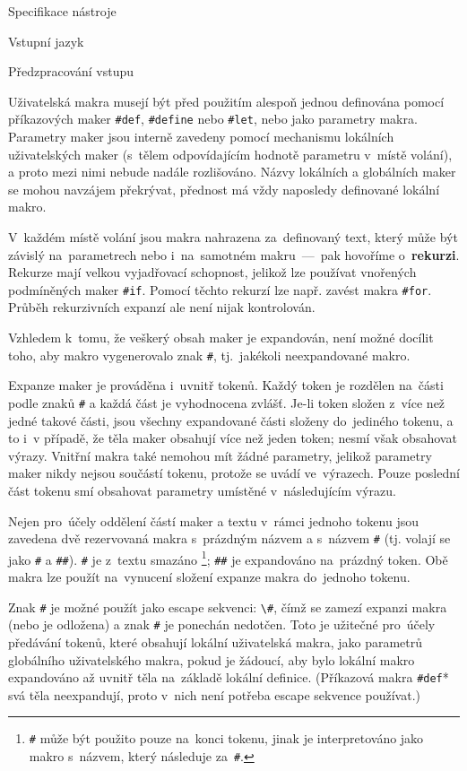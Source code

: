 \documentclass[thesis=M,czech]{FITthesis}[2012/06/26]
\newcommand{\id}[1]{\texttt{#1}}
\newcommand{\hll}[1]{\textbf{#1}}
\begin{document}
\begin{section}{Specifikace nástroje}
\begin{subsection}{Vstupní jazyk}
\begin{subsubsection}{Předzpracování vstupu}

\begin{paragraph}{Uživatelská makra}
\label{p:design:spec:ilang:macros:user}
musejí být před použitím alespoň jednou definována
pomocí příkazových maker \id{\#def}, \id{\#define} nebo \id{\#let},
nebo jako parametry makra.
Parametry maker jsou interně zavedeny pomocí mechanismu
lokálních uživatelských maker
(s~tělem odpovídajícím hodnotě parametru v~místě volání),
a proto mezi nimi
nebude nadále rozlišováno.
Názvy lokálních a globálních maker se mohou navzájem překrývat,
přednost má vždy naposledy definované lokální makro.

V~každém místě volání jsou makra nahrazena za~definovaný text,
který může být závislý na~parametrech
nebo i~na~samotném makru~---~pak hovoříme o~\hll{rekurzi}.
Rekurze mají velkou vyjadřovací schopnost,
jelikož lze používat vnořených podmíněných maker \id{\#if}.
Pomocí těchto rekurzí lze např. zavést
makra \id{\#for}.
Průběh rekurzivních expanzí ale není nijak kontrolován.

Vzhledem k~tomu, že veškerý obsah maker je expandován,
není možné docílit toho, aby makro vygenerovalo znak \id{\#},
tj.~jakékoli neexpandované makro.

Expanze maker je prováděna i~uvnitř tokenů.
Každý token je rozdělen na~části
podle znaků \id{\#}
a každá část je vyhodnocena zvlášť.
Je-li token složen z~více než jedné takové části,
jsou všechny expandované části složeny do~jediného tokenu,
a to i~v případě, že těla maker obsahují více než jeden token;
nesmí však obsahovat výrazy.
Vnitřní makra také nemohou mít žádné parametry,
jelikož parametry maker nikdy nejsou součástí tokenu,
protože se uvádí ve~výrazech.
Pouze poslední část tokenu smí obsahovat parametry
umístěné v~následujícím výrazu.

Nejen pro~účely oddělení částí maker a textu v~rámci jednoho tokenu
jsou zavedena dvě rezervovaná makra s~prázdným názvem
a s~názvem \id{\#}
(tj. volají se jako \id{\#} a \id{\#\#}).
\id{\#} je z~textu smazáno%
\footnote{\id{\#} může být použito pouze na~konci tokenu,
jinak je interpretováno jako makro s~názvem,
který následuje za~\id{\#}.};
\id{\#\#} je expandováno na~prázdný token.
Obě makra lze použít na~vynucení složení expanze makra do~jednoho tokenu.

Znak \id{\#} je možné použít jako escape sekvenci:
\id{\textbackslash\#},
čímž se zamezí expanzi makra (nebo je odložena)
a znak \id{\#} je ponechán nedotčen.
Toto je užitečné pro~účely předávání
tokenů, které obsahují lokální uživatelská makra,
jako parametrů globálního uživatelského makra,
pokud je žádoucí, aby bylo lokální makro expandováno až uvnitř těla
na~základě lokální definice.
(Příkazová makra \id{\#def}* svá těla neexpandují,
proto v~nich není potřeba escape sekvence používat.)


\end{paragraph}
\end{subsubsection}
\end{subsection}
\end{section}
\end{document}
